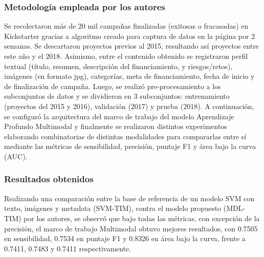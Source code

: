 \subsubsection{Metodología empleada por los autores}
Se recolectaron más de 20 mil campañas finalizadas (exitosas o fracasadas) en Kickstarter gracias a algoritmo creado para captura de datos en la página por 2 semanas. Se descartaron proyectos previos al 2015, resultando así proyectos entre este año y el 2018. Asimismo, entre el contenido obtenido se registraron perfil textual (título, resumen, descripción del financiamiento, y riesgos/retos), imágenes (en formato jpg), categorías, meta de financiamiento, fecha de inicio y de finalización de campaña. Luego, se realizó pre-procesamiento a los subconjuntos de datos y se dividieron en 3 subconjuntos: entrenamiento (proyectos del 2015 y 2016), validación (2017) y prueba (2018). A continuación, se configuró la arquitectura del marco de trabajo del modelo Aprendizaje Profundo Multimodal y finalmente se realizaron distintos experimentos elaborando combinatorias de distintas modalidades para compararlas entre sí mediante las métricas de sensibilidad, precisión, puntaje F1 y área bajo la curva (AUC).

\subsubsection{Resultados obtenidos}
Realizando una comparación entre la base de referencia de un modelo SVM con texto, imágenes y metadata (SVM-TIM), contra el modelo propuesto (MDL-TIM) por los autores, se observó que bajo todas las métricas, con excepción de la precisión, el marco de trabajo Multimodal obtuvo mejores resultados, con 0.7505 en sensibilidad, 0.7534 en puntaje F1 y 0.8326 en área bajo la curva, frente a 0.7411, 0.7483 y 0.7411 respectivamente.